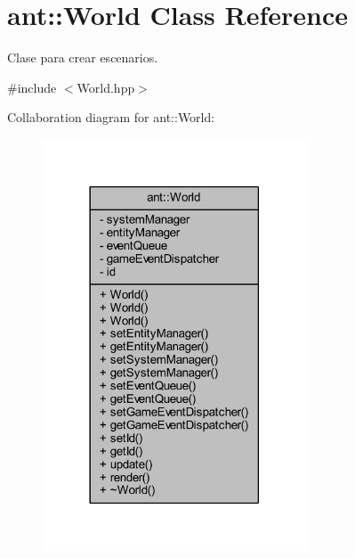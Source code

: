\hypertarget{classant_1_1_world}{\section{ant\+:\+:World Class Reference}
\label{classant_1_1_world}
}


Clase para crear escenarios.  




{\ttfamily \#include $<$World.\+hpp$>$}



Collaboration diagram for ant\+:\+:World\+:
\nopagebreak
\begin{figure}[H]
\begin{center}
\leavevmode
\includegraphics[width=222pt]{d9/d07/classant_1_1_world__coll__graph}
\end{center}
\end{figure}
